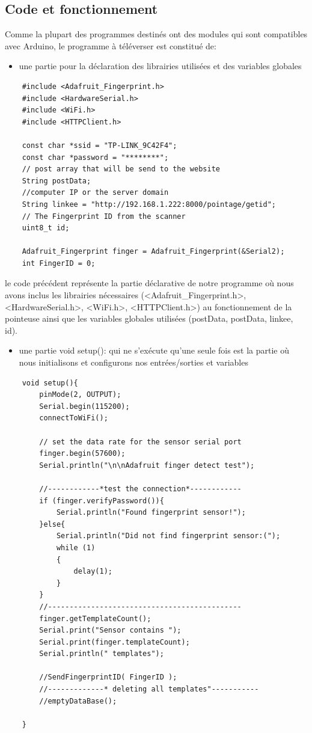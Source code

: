 \subsection{Code et fonctionnement}    
Comme la plupart des programmes destinés ont des modules qui sont compatibles
avec Arduino, le programme à téléverser est constitué de: 

\begin{itemize}
    \item [\textbullet] une partie pour la déclaration des librairies utilisées et
        des variables globales
\end{itemize}

\begin{verbatim}
    #include <Adafruit_Fingerprint.h>
    #include <HardwareSerial.h>
    #include <WiFi.h>
    #include <HTTPClient.h>

    const char *ssid = "TP-LINK_9C42F4";
    const char *password = "********";
    // post array that will be send to the website
    String postData;    
    //computer IP or the server domain 
    String linkee = "http://192.168.1.222:8000/pointage/getid"; 
    // The Fingerprint ID from the scanner
    uint8_t id; 

    Adafruit_Fingerprint finger = Adafruit_Fingerprint(&Serial2);
    int FingerID = 0;
\end{verbatim}

le code précédent représente la partie déclarative de notre programme où nous
avons inclus les librairies nécessaires (<Adafruit\_Fingerprint.h>,
<HardwareSerial.h>, <WiFi.h>, <HTTPClient.h>) au fonctionnement de la pointeuse
ainsi que les variables globales utilisées (postData, postData, linkee, id).

\begin{itemize}
    \item [\textbullet] une partie void setup(): qui ne s’exécute qu’une seule
        fois est la partie où nous initialisons et configurons nos
        entrées/sorties et variables 
\end{itemize}    

\begin{verbatim}
    void setup(){
        pinMode(2, OUTPUT);
        Serial.begin(115200);
        connectToWiFi();

        // set the data rate for the sensor serial port
        finger.begin(57600);
        Serial.println("\n\nAdafruit finger detect test");

        //------------*test the connection*------------
        if (finger.verifyPassword()){
            Serial.println("Found fingerprint sensor!");
        }else{
            Serial.println("Did not find fingerprint sensor:(");
            while (1)
            {
                delay(1);
            }
        }
        //---------------------------------------------
        finger.getTemplateCount();
        Serial.print("Sensor contains ");
        Serial.print(finger.templateCount);
        Serial.println(" templates");

        //SendFingerprintID( FingerID );
        //-------------* deleting all templates"-----------
        //emptyDataBase();

    }
\end{verbatim}

